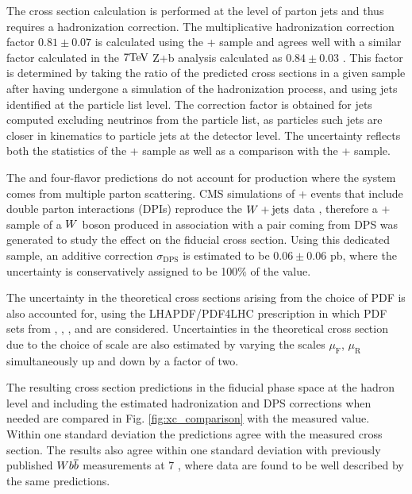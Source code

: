 The \MCFM cross section calculation is
 performed at the level of parton jets and thus
 requires a hadronization correction.
The multiplicative hadronization correction factor $0.81\pm0.07$
 is calculated using the \MADGRAPH + \PYTHIAs sample
 and agrees well with a
 similar factor calculated in the $7\mathrm{TeV}$ Z+b analysis
 calculated as $0.84\pm0.03$  \cite{Chatrchyan:2014dha}.
This factor is determined by 
 taking the ratio of the predicted cross sections
 in a given sample after having undergone a simulation
 of the hadronization process, and using
 jets identified at the particle list level.
The correction factor is obtained for
 jets computed excluding neutrinos from the particle list, as particles
 such jets are closer in kinematics
 to particle jets at the detector level.
The uncertainty reflects both the statistics of the
 \MADGRAPH + \PYTHIAs sample as well as a comparison with the
 \MADGRAPH + \PYTHIAe sample.

The \MCFM and four-flavor \MADGRAPH predictions do not account for
 \wbb production where the \bbbar system comes from multiple parton scattering.
CMS simulations of \MADGRAPH + \PYTHIA events that include
 double parton interactions (DPIs) reproduce the $W+\mathrm{jets}$ data \cite{Chatrchyan:2013xxa},
 therefore a \MADGRAPH + \PYTHIAe sample of a $W$ boson produced in association with a
 \bbbar pair coming from DPS
 was generated to study the effect on the fiducial cross section.
Using this dedicated sample, an additive correction $\sigma_{\mathrm{DPS}}$
 is estimated to be $0.06\pm0.06$ pb, where the uncertainty
 is conservatively assigned to be 100$\%$ of the value.

The uncertainty in the theoretical cross sections arising
 from the choice of PDF is also accounted for,
 using the LHAPDF/PDF4LHC \cite{LHAPDF,Botje:2011sn,Alekhin:2011sk,Ball:2012cx}
 prescription in which
 PDF sets from \CTEQ, \MSTW, \NNPDF, and \HERA are considered.
Uncertainties in the theoretical cross section due to the
 choice of scale are also estimated by varying the scales
 $\mu_{\mathrm{F}}$, $\mu_{\mathrm{R}}$ simultaneously
 up and down by a factor of two.

The resulting cross section predictions in the fiducial
 phase space at the hadron level and including the estimated
 hadronization and DPS corrections when needed
 are compared in Fig. \ref{fig:xc_comparison}
 with the measured value.
Within one standard deviation the predictions agree with the measured cross section.
The results also agree within one standard deviation with previously published $W b\overline{b}$
 measurements at 7 \TeV, where
 data are found to be well described by the same predictions.

